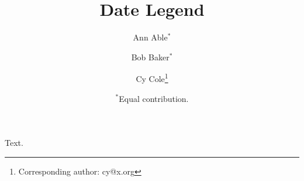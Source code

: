 \documentclass{article}
\title{Date Legend}
\author{Ann Able$^{*}$ \and Bob Baker$^{*}$ \and Cy Cole\thanks{Corresponding author: cy@x.org}}
\date{$^{*}$Equal contribution.}
\begin{document}
\maketitle
Text.
\end{document}
